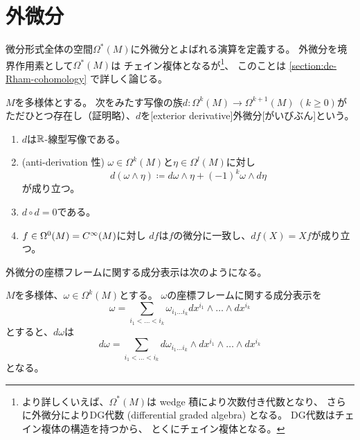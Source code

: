 \documentclass[report]{jlreq}
\begin{document}
\section{外微分}

微分形式全体の空間$\Omega^*(M)$に外微分とよばれる演算を定義する。
外微分を境界作用素として$\Omega^*(M)$は
チェイン複体となるが\footnote{
    より詳しくいえば、$\Omega^*(M)$は wedge 積により次数付き代数となり、
    さらに外微分によりDG代数 (differential graded algebra) となる。
    DG代数はチェイン複体の構造を持つから、
    とくにチェイン複体となる。
}、
このことは \cref{section:de-Rham-cohomology} で詳しく論じる。

\begin{definition}[外微分]
    $M$を多様体とする。
    次をみたす写像の族$d \colon \Omega^k(M) \to \Omega^{k+1}(M)\; (k \ge 0)$が
    ただひとつ存在し（証明略）、$d$を[exterior derivative]{外微分}[がいびぶん]という。
    \begin{enumerate}
        \item $d$は$\mathbb{R}$-線型写像である。
        \item (anti-derivation 性)
            $\omega \in \Omega^k(M)$と$\eta \in \Omega^l(M)$に対し
            \begin{equation}
                d(\omega \wedge \eta)
                    \coloneqq d\omega \wedge \eta + (-1)^k \omega \wedge d\eta
            \end{equation}
            が成り立つ。
        \item $d \circ d = 0$である。
        \item $f \in \Omega^0(M) = C^\infty(M)$に対し
            $df$は$f$の微分に一致し、$df(X) = Xf$が成り立つ。
    \end{enumerate}
\end{definition}

外微分の座標フレームに関する成分表示は次のようになる。

\begin{proposition}[外微分の座標フレームに関する成分表示]
    $M$を多様体、$\omega \in \Omega^k(M)$とする。
    $\omega$の座標フレームに関する成分表示を
    \begin{equation}
        \omega = \sum_{i_1 < \dots < i_k}
            \omega_{i_1 \dots i_k} dx^{i_1} \wedge \dots \wedge dx^{i_k}
    \end{equation}
    とすると、$d\omega$は
    \begin{equation}
        d\omega = \sum_{i_1 < \dots < i_k}
            d\omega_{i_1 \dots i_k} \wedge dx^{i_1} \wedge \dots \wedge dx^{i_k}
    \end{equation}
    となる。
\end{proposition}
\end{document}
